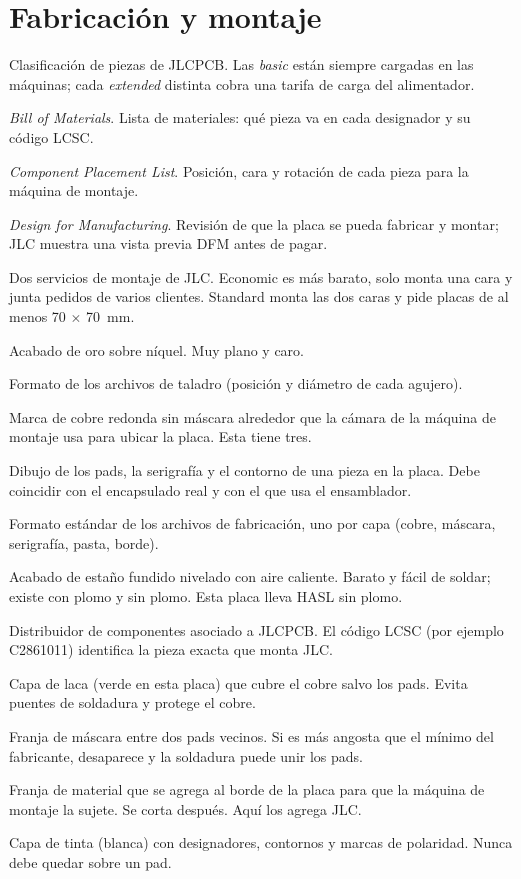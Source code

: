 \section*{Fabricación y montaje}
\begin{description}[style=sameline,leftmargin=1.5em,labelindent=0pt]
  \item[Basic / Extended] Clasificación de piezas de JLCPCB. Las \emph{basic} están siempre cargadas en las máquinas;
  cada \emph{extended} distinta cobra una tarifa de carga del alimentador.
  \item[BOM] \emph{Bill of Materials}. Lista de materiales: qué pieza va en cada designador y su código LCSC.
  \item[CPL] \emph{Component Placement List}. Posición, cara y rotación de cada pieza para la máquina de montaje.
  \item[DFM] \emph{Design for Manufacturing}. Revisión de que la placa se pueda fabricar y montar; JLC muestra una vista
  previa DFM antes de pagar.
  \item[Economic / Standard PCBA] Dos servicios de montaje de JLC. Economic es más barato, solo monta una cara y junta
  pedidos de varios clientes. Standard monta las dos caras y pide placas de al menos \SI{70}{} $\times$
  \SI{70}{\milli\meter}.
  \item[ENIG] Acabado de oro sobre níquel. Muy plano y caro.
  \item[Excellon] Formato de los archivos de taladro (posición y diámetro de cada agujero).
  \item[Fiducial] Marca de cobre redonda sin máscara alrededor que la cámara de la máquina de montaje usa para
  ubicar la placa. Esta tiene tres.
  \item[Footprint] Dibujo de los pads, la serigrafía y el contorno de una pieza en la placa. Debe coincidir con el
  encapsulado real y con el que usa el ensamblador.
  \item[Gerber] Formato estándar de los archivos de fabricación, uno por capa (cobre, máscara, serigrafía, pasta,
  borde).
  \item[HASL] Acabado de estaño fundido nivelado con aire caliente. Barato y fácil de soldar; existe con plomo y sin
  plomo. Esta placa lleva HASL sin plomo.
  \item[LCSC] Distribuidor de componentes asociado a JLCPCB. El código LCSC (por ejemplo C2861011) identifica la pieza
  exacta que monta JLC.
  \item[Máscara de soldadura] Capa de laca (verde en esta placa) que cubre el cobre salvo los pads. Evita puentes de
  soldadura y protege el cobre.
  \item[Puente de máscara] Franja de máscara entre dos pads vecinos. Si es más angosta que el mínimo del fabricante,
  desaparece y la soldadura puede unir los pads.
  \item[Riel (edge rail)] Franja de material que se agrega al borde de la placa para que la máquina de montaje la sujete.
  Se corta después. Aquí los agrega JLC.
  \item[Serigrafía] Capa de tinta (blanca) con designadores, contornos y marcas de polaridad. Nunca debe quedar sobre
  un pad.
\end{description}

